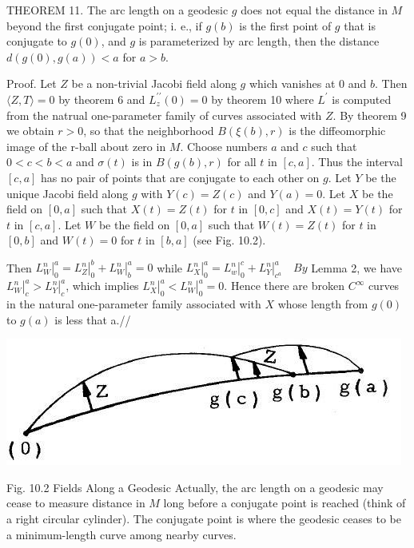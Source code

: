 \documentclass[10pt]{article}
\begin{document}
THEOREM 11. The arc length on a geodesic $g$ does not equal the distance in $M$ beyond the first conjugate point; i. e., if $g(b)$ is the first point of $g$ that is conjugate to $g(0)$, and $g$ is parameterized by arc length, then the distance $d(g(0), g(a))<a$ for $a>b$.

Proof. Let $Z$ be a non-trivial Jacobi field along $g$ which vanishes at 0 and $b$. Then $\langle Z, T\rangle=0$ by theorem 6 and $L_{z}^{\prime \prime}(0)=0$ by theorem 10 where $L^{\prime}$ is computed from the natrual one-parameter family of curves associated with $Z$. By theorem 9 we obtain $r>0$, so that the neighborhood $B(\xi(b), r)$ is the diffeomorphic image of the r-ball about zero in $M$. Choose numbers $a$ and $c$ such that $0<c<b<a$ and $\sigma(t)$ is in $B(g(b), r)$ for all $t$ in $[c, a]$. Thus the interval $[c, a]$ has no pair of points that are conjugate to each other on $g$. Let $Y$ be the unique Jacobi field along $g$ with $Y(c)=Z(c)$ and $Y(a)=0$. Let $X$ be the field on $[0, a]$ such that $X(t)=Z(t)$ for $t$ in $[0, c]$ and $X(t)=Y(t)$ for $t$ in $[c, a]$. Let $W$ be the field on $[0, a]$ such that $W(t)=Z(t)$ for $t$ in $[0, b]$ and $W(t)=0$ for $t$ in $[b, a]$ (see Fig. 10.2).

Then $\left.L_{W}^{n}\right|_{0} ^{a}=\left.L_{Z}^{n}\right|_{0} ^{b}+\left.L_{W}^{n}\right|_{b} ^{a}=0$ while $\left.L_{X}^{n}\right|_{0} ^{a}=\left.L_{w}^{n}\right|_{0} ^{c}+\left.L_{Y}^{n}\right|_{c^{a}} ^{a} \quad B y$ Lemma 2, we have $\left.L_{W}^{n}\right|_{c} ^{a}>\left.L_{Y}^{n}\right|_{c} ^{a}$, which implies $\left.L_{X}^{n}\right|_{0} ^{a}<\left.L_{W}^{n}\right|_{0} ^{a}=0 .$ Hence there are broken $C^{\infty}$ curves in the natural one-parameter family associated with $X$ whose length from $g(0)$ to $g(a)$ is less that a.//

\includegraphics[max width=\textwidth]{2022_07_16_f4e476ee2159dc67e746g-80}

Fig. 10.2 Fields Along a Geodesic Actually, the arc length on a geodesic may cease to measure distance in $M$ long before a conjugate point is reached (think of a right circular cylinder). The conjugate point is where the geodesic ceases to be a minimum-length curve among nearby curves.
\end{document}
